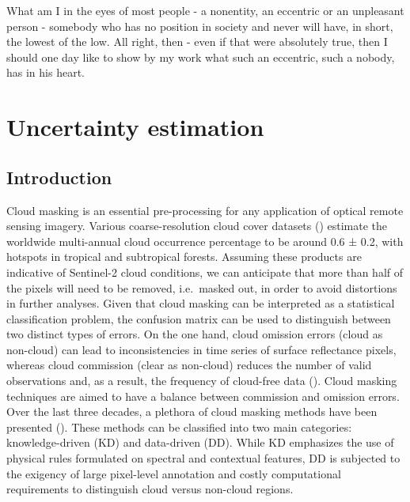 \documentclass[a4paper, nobind]{templates/cdethesis}
\begin{document}
\begin{savequote}
What am I in the eyes of most people - a nonentity, an eccentric or an
unpleasant person - somebody who has no position in society and never
will have, in short, the lowest of the low. All right, then - even if
that were absolutely true, then I should one day like to show by my work
what such an eccentric, such a nobody, has in his heart.
\end{savequote}



\hypertarget{uncertainty-estimation}{%
\chapter{Uncertainty estimation}\label{uncertainty-estimation}}

\minitoc 

\hypertarget{introduction-1}{%
\section{Introduction}\label{introduction-1}}

Cloud masking is an essential pre-processing for any application of optical remote sensing imagery. Various coarse-resolution cloud cover datasets (\cite{sassen2008classifying, winker2010calipso, Wilson2016}) estimate the worldwide multi-annual cloud occurrence percentage to be around 0.6 ± 0.2, with hotspots in tropical and subtropical forests. Assuming these products are indicative of Sentinel-2 cloud conditions, we can anticipate that more than half of the pixels will need to be removed, i.e.~masked out, in order to avoid distortions in further analyses. Given that cloud masking can be interpreted as a statistical classification problem, the confusion matrix can be used to distinguish between two distinct types of errors. On the one hand, cloud omission errors (cloud as non-cloud) can lead to inconsistencies in time series of surface reflectance pixels, whereas cloud commission (clear as non-cloud) reduces the number of valid observations and, as a result, the frequency of cloud-free data (\cite{skakun2022cloud}). Cloud masking techniques are aimed to have a balance between commission and omission errors. Over the last three decades, a plethora of cloud masking methods have been presented (\cite{Hagolle2017, Domnich2021, Louis2016, Qiu2019, richter2019atmospheric, jan_wevers_2021_5788067, Lopez-Puigdollers2021, frantz2019force}). These methods can be classified into two main categories: knowledge-driven (KD) and data-driven (DD). While KD emphasizes the use of physical rules formulated on spectral and contextual features, DD is subjected to the exigency of large pixel-level annotation and costly computational requirements to distinguish cloud versus non-cloud regions.
\end{document}
